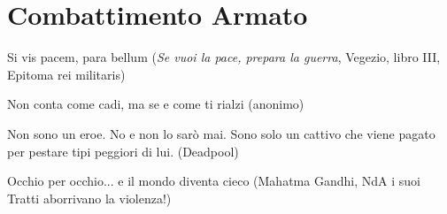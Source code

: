 \section{Combattimento Armato}\label{combattimento-armato}

\begin{enfasi}{
Si vis pacem, para bellum (\emph{Se vuoi la pace, prepara la guerra}, Vegezio, libro III, Epitoma rei militaris)
\smallskip

Non conta come cadi, ma se e come ti rialzi (anonimo)

\smallskip

Non sono un eroe. No e non lo sarò mai. Sono solo un cattivo che viene pagato per pestare tipi peggiori di lui. (Deadpool)

\smallskip

Occhio per occhio... e il mondo diventa cieco (Mahatma Gandhi, NdA i suoi Tratti aborrivano la violenza!)}\end{enfasi}

